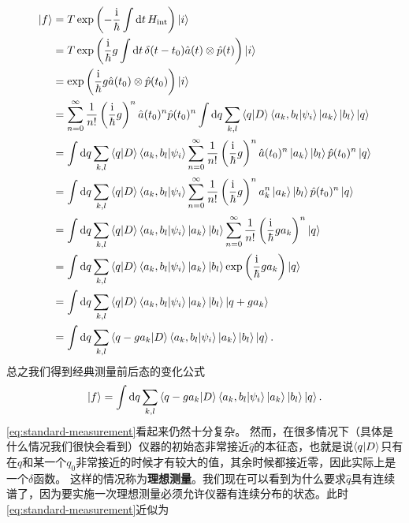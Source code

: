 \documentclass[hyperref, UTF8, a4paper]{ctexart}
\newcommand*{\ii}{\mathrm{i}}
\begin{document}
\[
    \begin{aligned}
        \ket{f} &= T \exp \left( - \frac{\ii}{\hbar} \int \dd{t} H_\text{int} \right) \ket{i} \\
        &= T \exp \left( \frac{\ii}{\hbar} g \int \dd{t} \delta(t-t_0) \hat{a}(t) \otimes \hat{p}(t) \right) \ket{i} \\
        &= \exp \left( \frac{\ii}{\hbar} g \hat{a}(t_0) \otimes \hat{p}(t_0) \right) \ket{i} \\
        &= \sum_{n=0}^\infty \frac{1}{n!} \left(\frac{\ii}{\hbar} g\right)^n \hat{a}(t_0)^n \hat{p}(t_0)^n \int \dd{q} \sum_{k, l} \braket{q}{D} \braket{a_k, b_l}{\psi_i} \ket{a_k} \ket{b_l} \ket{q} \\
        &= \int \dd{q} \sum_{k, l} \braket{q}{D} \braket{a_k, b_l}{\psi_i} \sum_{n=0}^\infty \frac{1}{n!} \left(\frac{\ii}{\hbar} g\right)^n \hat{a}(t_0)^n \ket{a_k} \ket{b_l} \hat{p}(t_0)^n \ket{q} \\
        &= \int \dd{q} \sum_{k, l} \braket{q}{D} \braket{a_k, b_l}{\psi_i} \sum_{n=0}^\infty \frac{1}{n!} \left(\frac{\ii}{\hbar} g\right)^n a_k^n \ket{a_k} \ket{b_l} \hat{p}(t_0)^n \ket{q} \\
        &= \int \dd{q} \sum_{k, l} \braket{q}{D} \braket{a_k, b_l}{\psi_i} \ket{a_k} \ket{b_l} \sum_{n=0}^\infty \frac{1}{n!} \left(\frac{\ii}{\hbar} g a_k \right)^n \ket{q} \\
        &= \int \dd{q} \sum_{k, l} \braket{q}{D} \braket{a_k, b_l}{\psi_i} \ket{a_k} \ket{b_l} \exp \left( \frac{\ii}{\hbar} g a_k \right) \ket{q} \\
        &= \int \dd{q} \sum_{k, l} \braket{q}{D} \braket{a_k, b_l}{\psi_i} \ket{a_k} \ket{b_l} \ket{q + g a_k} \\
        &= \int \dd{q} \sum_{k, l} \braket{q - g a_k}{D} \braket{a_k, b_l}{\psi_i} \ket{a_k} \ket{b_l} \ket{q} .
    \end{aligned}
\]
总之我们得到经典测量前后态的变化公式
\begin{equation}
    \ket{f} = \int \dd{q} \sum_{k, l} \braket{q - g a_k}{D} \braket{a_k, b_l}{\psi_i} \ket{a_k} \ket{b_l} \ket{q}.
    \label{eq:standard-measurement}
\end{equation}
\eqref{eq:standard-measurement}看起来仍然十分复杂。
然而，在很多情况下（具体是什么情况我们很快会看到）仪器的初始态非常接近$\hat{q}$的本征态，也就是说$\braket{q}{D}$只有在$q$和某一个$q_0$非常接近的时候才有较大的值，其余时候都接近零，因此实际上是一个$\delta$函数。
这样的情况称为\textbf{理想测量}。我们现在可以看到为什么要求$\hat{q}$具有连续谱了，因为要实施一次理想测量必须允许仪器有连续分布的状态。此时\eqref{eq:standard-measurement}近似为
\end{document}

